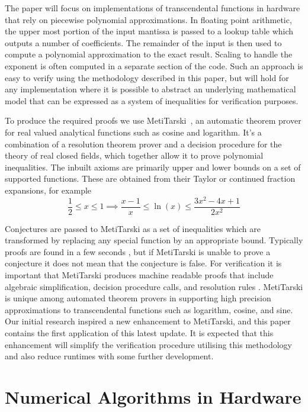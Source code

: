 \documentclass[a4paper]{article}
\begin{document}
The paper will focus on implementations of transcendental functions in hardware that rely on piecewise polynomial approximations. In floating point arithmetic, the upper most portion of the input mantissa is passed to a lookup table which outputs a number of coefficients. The remainder of the input is then used to compute a polynomial approximation to the exact result. Scaling to handle the exponent is often computed in a separate section of the code. Such an approach is easy to verify using the methodology described in this paper, but will hold for any implementation where it is possible to abstract an underlying mathematical model that can be expressed as a system of inequalities for verification purposes.

To produce the required proofs we use MetiTarski~\cite{akbarpour2010metitarski}, an automatic theorem prover for real valued analytical functions such as cosine and logarithm. It's a combination of a resolution theorem prover and a decision procedure for the theory of real closed fields, which together allow it to prove polynomial inequalities. The inbuilt axioms are primarily upper and lower bounds on a set of supported functions. These are obtained from their Taylor or continued fraction expansions, for example
$$\frac{1}{2} \leq x \leq 1 \implies \frac{x-1}{x} \leq \ln(x) \leq \frac{3x^2-4x+1}{2x^2}$$\newline

Conjectures are passed to MetiTarski as a set of inequalities which are transformed by replacing any special function by an appropriate bound. Typically proofs are found in a few seconds \cite{akbarpour2009applications}, but if MetiTarski is unable to prove a conjecture it does not mean that the conjecture is false. For verification it is important that MetiTarski produces machine readable proofs that include algebraic simplification, decision procedure calls, and resolution rules \cite{denman2009formal}. MetiTarski is unique among automated theorem provers in supporting high precision approximations to transcendental functions such as logarithm, cosine, and sine. Our initial research inspired a new enhancement to MetiTarski, and this paper contains the first application of this latest update. It is expected that this enhancement will simplify the verification procedure utilising this methodology and also reduce runtimes with some further development. 



\section{Numerical Algorithms in Hardware}
\end{document}
